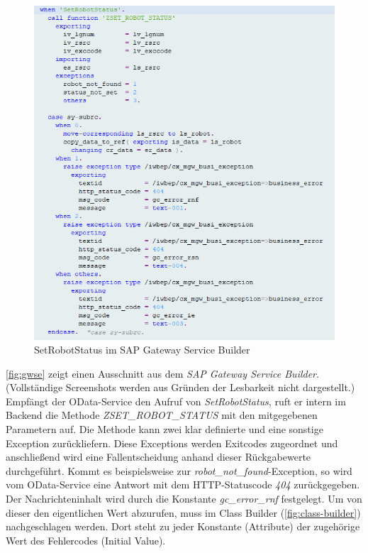 \begin{figure}[ht]
	\centering
	\includegraphics[width=\textwidth]{Bilder/ABAP/2020-12-04 10_20_43-Class Builder Class ZCL_ZEWM_ROBCO_DPC_EXT Display_cut.png}
	\caption{SetRobotStatus im SAP Gateway Service Builder}
	\label{fig:gwse}
\end{figure}

\autoref{fig:gwse} zeigt einen Ausschnitt aus dem \emph{SAP Gateway Service Builder}.
(Vollständige Screenshots werden aus Gründen der Lesbarkeit nicht dargestellt.)
Empfängt der OData-Service den Aufruf von \emph{SetRobotStatus}, ruft er intern im Backend die Methode \emph{ZSET\_ROBOT\_STATUS} mit den mitgegebenen Parametern auf.
Die Methode kann zwei klar definierte und eine sonstige Exception zurückliefern.
Diese Exceptions werden Exitcodes zugeordnet und anschließend wird eine Fallentscheidung anhand dieser Rückgabewerte durchgeführt.
Kommt es beispielsweise zur \emph{robot\_not\_found}-Exception, so wird vom OData-Service eine Antwort mit dem \ac{HTTP}-Statuscode \emph{404} zurückgegeben.
Der Nachrichteninhalt wird durch die Konstante \emph{gc\_error\_rnf} festgelegt.
Um von dieser den eigentlichen Wert abzurufen, muss im Class Builder (\autoref{fig:class-builder}) nachgeschlagen werden.
Dort steht zu jeder Konstante (Attribute) der zugehörige Wert des Fehlercodes (Initial Value).


